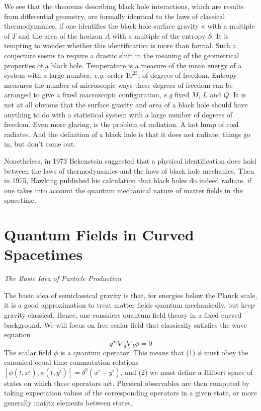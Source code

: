 \documentclass[12pt]{article}
\newcommand{\be}{\begin{equation}}
\newcommand{\ee}{\end{equation}}
\begin{document}
We see that the theorems describing black hole interactions, which are
results from
differential geometry, are formally identical to the laws of classical
thermodynamics, if one
identifies the black hole surface gravity $\kappa$ with a multiple of $T$ and the area of
the horizon $A$ with a multiple of the entropy $S$.   It is tempting to
wonder whether this
identification is more than formal.  Such a conjecture seems to require a
drastic
shift in the meaning of the geometrical properties of a black hole.
Temperature is a
measure of the mean energy of a  system with a large number, {\it e.g.}
order $10^{23}$, of
degrees of freedom. Entropy measures the number of microscopic ways these
degrees of
freedom can be arranged to give a fixed macroscopic configuration, {\it
e.g} fixed $M$, $L$
and $Q$. It is not at all obvious that the surface gravity and area of a
black hole should
have anything to do with a statistical system with a large number of degrees of
freedom.  Even more glaring, is the problem of radiation.  A hot lump of
coal radiates. And
the definition of a black hole is that it does not radiate; things go in,
but don't come out.

Nonetheless, in 1973 Bekenstein \cite{beck} suggested that a physical
identification does hold
between the  laws of thermodynamics and the laws of black hole mechanics.
Then in 1975,
Hawking published his calculation that black holes do indeed radiate, if
one takes into
account the quantum mechanical nature of matter fields in the spacetime.


\section{Quantum Fields in Curved Spacetimes}
\label{qftcs}

\vskip 0.1in\noindent
{\it The Basic Idea of Particle Production}
\vskip 0.05in

The basic idea of semiclassical gravity is that, for energies below the
Planck scale,
it is a good approximation to treat matter fields quantum mechanically, but keep
gravity classical.  Hence, one considers quantum field theory in a fixed
curved background.
We will focus on free scalar field that classically satisfies the wave equation
%
\be\label{wave}g^{ab}\nabla _a \nabla _b \phi =0\ee
%
The scalar field $\phi$ is a quantum operator. This means that
(1) $\phi$ must obey the canonical equal time commutation relations
$[\phi (t, x^i ), \phi (t, y^i )] =\delta ^3 (x^i -y^i )$,
and (2) we must define a Hilbert space of states on which these operators act.
Physical observables are then computed by taking expectation values of the
corresponding operators in a given
state, or more generally matrix elements between states.
\end{document}

